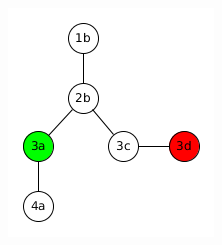 \documentclass{article}
\begin{document}
\begin{figure}[htb!]
	\centering
	\begin{subfigure}{0.22\textwidth}
		\includegraphics[width=\linewidth]{small_DNA_graph_bfs1.png}			
		
		\vspace{0.2cm}
		

\end{subfigure}
\end{figure}
\end{document}
